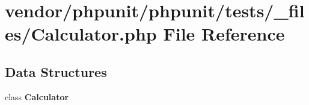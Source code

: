\section{vendor/phpunit/phpunit/tests/\+\_\+files/\+Calculator.php File Reference}
\label{_calculator_8php}
\subsection*{Data Structures}
\begin{DoxyCompactItemize}
\item 
class {\bf Calculator}
\end{DoxyCompactItemize}
